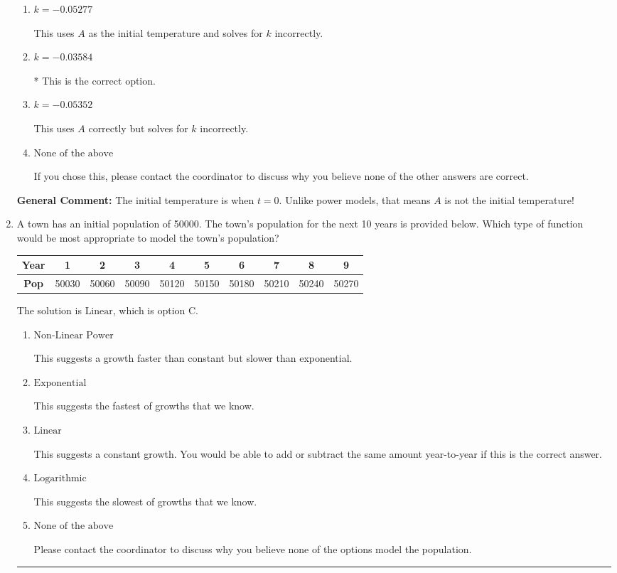 \documentclass{extbook}[14pt]
\newcommand{\litem}[1]{\item #1

\rule{\textwidth}{0.4pt}}
\begin{document}
\begin{enumerate}
{\begin{enumerate}[label=\Alph*.]
This uses $A$ as the initial temperature and solves for $k$ correctly.
\item \( k = -0.05277 \)

This uses $A$ as the initial temperature and solves for $k$ incorrectly.
\item \( k = -0.03584 \)

* This is the correct option.
\item \( k = -0.05352 \)

This uses $A$ correctly but solves for $k$ incorrectly.
\item \( \text{None of the above} \)

If you chose this, please contact the coordinator to discuss why you believe none of the other answers are correct.
\end{enumerate}

\textbf{General Comment:} The initial temperature is when $t = 0$. Unlike power models, that means $A$ is not the initial temperature!
}
\litem{
A town has an initial population of 50000. The town's population for the next 10 years is provided below. Which type of function would be most appropriate to model the town's population?


\begin{tabular}{c|c|c|c|c|c|c|c|c|c}
\textbf{Year} &1 &2 &3 &4 &5 &6 &7 &8 &9\tabularnewline \hline
\textbf{Pop} &50030 &50060 &50090 &50120 &50150 &50180 &50210 &50240 &50270\end{tabular}The solution is \( \text{Linear} \), which is option C.\begin{enumerate}[label=\Alph*.]
\item \( \text{Non-Linear Power} \)

This suggests a growth faster than constant but slower than exponential.
\item \( \text{Exponential} \)

This suggests the fastest of growths that we know.
\item \( \text{Linear} \)

This suggests a constant growth. You would be able to add or subtract the same amount year-to-year if this is the correct answer.
\item \( \text{Logarithmic} \)

This suggests the slowest of growths that we know.
\item \( \text{None of the above} \)

Please contact the coordinator to discuss why you believe none of the options model the population.
\end{enumerate}

}
\end{enumerate}
\end{document}
